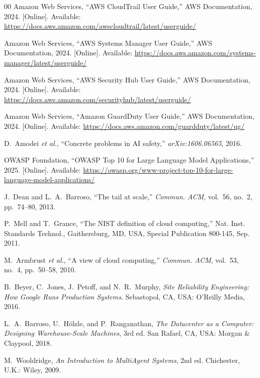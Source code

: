 \documentclass{ieeeaccess}
\begin{document}
\begin{thebibliography}{00}
Amazon Web Services, ``AWS CloudTrail User Guide,'' AWS Documentation, 2024. [Online]. Available: \url{https://docs.aws.amazon.com/awscloudtrail/latest/userguide/}

Amazon Web Services, ``AWS Systems Manager User Guide,'' AWS Documentation, 2024. [Online]. Available: \url{https://docs.aws.amazon.com/systems-manager/latest/userguide/}

Amazon Web Services, ``AWS Security Hub User Guide,'' AWS Documentation, 2024. [Online]. Available: \url{https://docs.aws.amazon.com/securityhub/latest/userguide/}

Amazon Web Services, ``Amazon GuardDuty User Guide,'' AWS Documentation, 2024. [Online]. Available: \url{https://docs.aws.amazon.com/guardduty/latest/ug/}

D.~Amodei \textit{et al.}, ``Concrete problems in AI safety,'' \textit{arXiv:1606.06565}, 2016.

OWASP Foundation, ``OWASP Top 10 for Large Language Model Applications,'' 2025. [Online]. Available: \url{https://owasp.org/www-project-top-10-for-large-language-model-applications/}

J.~Dean and L.~A.~Barroso, ``The tail at scale,'' \textit{Commun. ACM}, vol.~56, no.~2, pp.~74--80, 2013.

P.~Mell and T.~Grance, ``The NIST definition of cloud computing,'' Nat. Inst. Standards Technol., Gaithersburg, MD, USA, Special Publication 800-145, Sep. 2011.

M.~Armbrust \textit{et al.}, ``A view of cloud computing,'' \textit{Commun. ACM}, vol.~53, no.~4, pp.~50--58, 2010.

B.~Beyer, C.~Jones, J.~Petoff, and N.~R.~Murphy, \textit{Site Reliability Engineering: How Google Runs Production Systems}. Sebastopol, CA, USA: O'Reilly Media, 2016.

L.~A.~Barroso, U.~H\"olzle, and P.~Ranganathan, \textit{The Datacenter as a Computer: Designing Warehouse-Scale Machines}, 3rd ed. San Rafael, CA, USA: Morgan \& Claypool, 2018.

M.~Wooldridge, \textit{An Introduction to MultiAgent Systems}, 2nd ed. Chichester, U.K.: Wiley, 2009.
\end{thebibliography}
\end{document}
